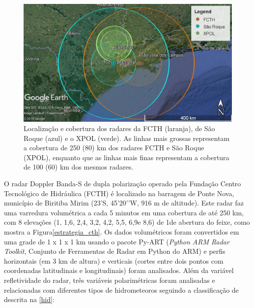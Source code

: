 \begin{figure}[htb]
	\begin{center}
		\caption{Localização e cobertura dos radares da FCTH (laranja), de São Roque (azul) e o XPOL (verde). As linhas mais grossas representam a cobertura de 250 (80) km dos radares FCTH e São Roque (XPOL), enquanto que as linhas mais finas representam a cobertura de 100 (60) km dos mesmos radares.} 
		\label{cobertura_radares}
		\includegraphics[width=\columnwidth]{figs/radar_coverages_hires2.jpg}
	\end{center}
\end{figure}

O radar Doppler Banda-S de dupla polarização operado pela Fundação Centro Tecnológico de Hidráulica (FCTH) é localizado na barragem de Ponte Nova, município de Biritiba Mirim (23’S, 45’20’’W, 916 m de altitude). Este radar faz uma varredura volumétrica a cada 5 minutos em uma cobertura de até 250 km, com 8 elevações (1\textdegree, 1,6\textdegree, 2,4\textdegree, 3,2\textdegree, 4,2\textdegree, 5,5\textdegree, 6,9\textdegree e 8,6\textdegree) de 1\textdegree de abertura do feixe, como mostra a Figura\autoref{estrategia_cth}. Os dados volumétricos foram convertidos em uma grade de 1 x 1 x 1 km usando o pacote Py-ART (\textit{Python ARM Radar Toolkit}, Conjunto de Ferramentas de Radar em Python do ARM) \cite{Helmus2016} e perfis horizontais (em 3 km de altura) e verticais (cortes entre dois pontos com coordenadas latitudinais e longitudinais) foram analisados. Além da variável refletividade do radar, três variáveis polarimétricas foram analisadas e relacionadas com diferentes tipos de hidrometeoros seguindo a classificação de  descrita na \autoref{hid}:

